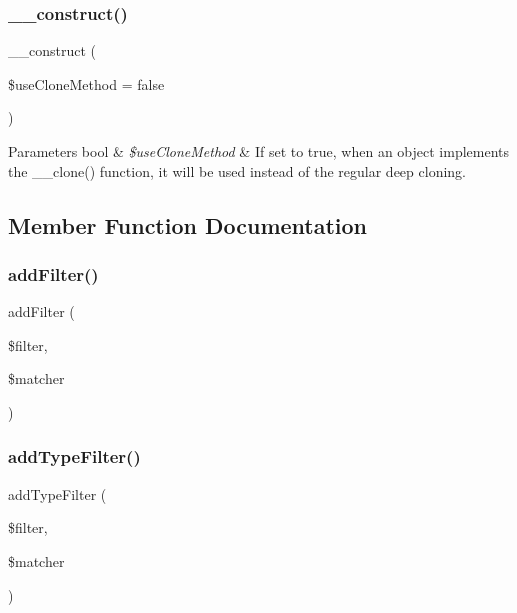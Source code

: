 \subsubsection{\texorpdfstring{\+\_\+\+\_\+construct()}{\_\_construct()}}
{\footnotesize\ttfamily \+\_\+\+\_\+construct (\begin{DoxyParamCaption}\item[{}]{\$use\+Clone\+Method = {\ttfamily false} }\end{DoxyParamCaption})}


\begin{DoxyParams}[1]{Parameters}
bool & {\em \$use\+Clone\+Method} & If set to true, when an object implements the \+\_\+\+\_\+clone() function, it will be used instead of the regular deep cloning. \\
\hline
\end{DoxyParams}


\subsection{Member Function Documentation}
\mbox{\label{class_deep_copy_1_1_deep_copy_ac0fe38a45487319202e8528ecc7bb868}} 
\subsubsection{\texorpdfstring{add\+Filter()}{addFilter()}}
{\footnotesize\ttfamily add\+Filter (\begin{DoxyParamCaption}\item[{\mbox{\hyperlink{interface_deep_copy_1_1_filter_1_1_filter}{Filter}}}]{\$filter,  }\item[{\mbox{\hyperlink{interface_deep_copy_1_1_matcher_1_1_matcher}{Matcher}}}]{\$matcher }\end{DoxyParamCaption})}

\mbox{\label{class_deep_copy_1_1_deep_copy_a110cd15e70339241896eddb1f359967f}} 
\subsubsection{\texorpdfstring{add\+Type\+Filter()}{addTypeFilter()}}
{\footnotesize\ttfamily add\+Type\+Filter (\begin{DoxyParamCaption}\item[{\mbox{\hyperlink{interface_deep_copy_1_1_type_filter_1_1_type_filter}{Type\+Filter}}}]{\$filter,  }\item[{\mbox{\hyperlink{class_deep_copy_1_1_type_matcher_1_1_type_matcher}{Type\+Matcher}}}]{\$matcher }\end{DoxyParamCaption})}

